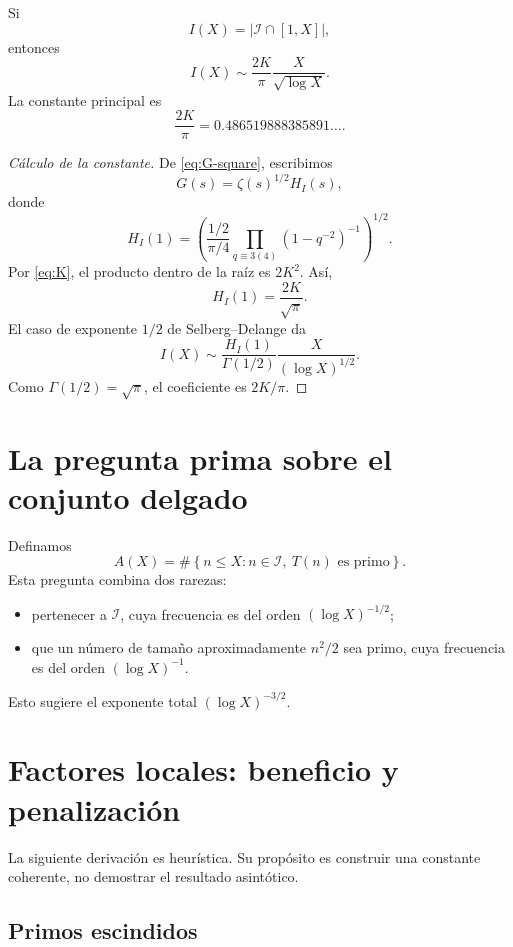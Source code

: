 \documentclass[11pt,a4paper,openany]{report}
\newcommand{\Iset}{\mathcal{I}}
\begin{document}
\begin{theorem}
Si
\[
 I(X)=|\Iset\cap[1,X]|,
\]
entonces
\begin{equation}
 \boxed{
 I(X)\sim\frac{2K}{\pi}\frac{X}{\sqrt{\log X}}.}
 \label{eq:inert-count}
\end{equation}
La constante principal es
\[
 \frac{2K}{\pi}=0.486519888385891\ldots.
\]
\end{theorem}

\begin{proof}[Cálculo de la constante]
De \eqref{eq:G-square}, escribimos
\[
 G(s)=\zeta(s)^{1/2}H_I(s),
\]
donde
\[
 H_I(1)
 =\left(\frac{1/2}{\pi/4}
 \prod_{q\equiv3(4)}(1-q^{-2})^{-1}\right)^{1/2}.
\]
Por \eqref{eq:K}, el producto dentro de la raíz es \(2K^2\). Así,
\[
 H_I(1)=\frac{2K}{\sqrt\pi}.
\]
El caso de exponente \(1/2\) de Selberg--Delange da
\[
 I(X)\sim\frac{H_I(1)}{\Gamma(1/2)}
 \frac{X}{(\log X)^{1/2}}.
\]
Como \(\Gamma(1/2)=\sqrt\pi\), el coeficiente es \(2K/\pi\).
\end{proof}

\section{La pregunta prima sobre el conjunto delgado}

Definamos
\begin{equation}
 A(X)=\#\left\{n\le X:n\in\Iset,\ T(n)\text{ es primo}\right\}.
 \label{eq:AX}
\end{equation}
Esta pregunta combina dos rarezas:
\begin{itemize}
\item pertenecer a \(\Iset\), cuya frecuencia es del orden \((\log X)^{-1/2}\);
\item que un número de tamaño aproximadamente \(n^2/2\) sea primo, cuya frecuencia es del orden \((\log X)^{-1}\).
\end{itemize}
Esto sugiere el exponente total \((\log X)^{-3/2}\).

\section{Factores locales: beneficio y penalización}

La siguiente derivación es heurística. Su propósito es construir una constante coherente, no demostrar el resultado asintótico.

\subsection{Primos escindidos}
\end{document}
